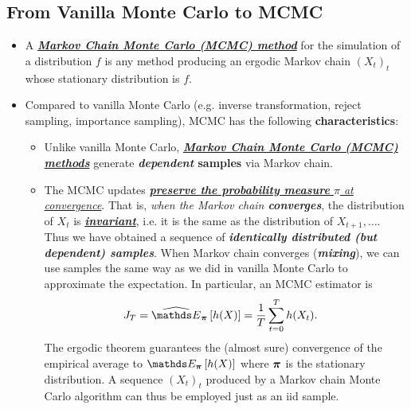 \documentclass[11pt]{article}
\begin{document}
\subsection{From Vanilla Monte Carlo to MCMC}
\begin{itemize}
\item \begin{definition}
A \underline{\emph{\textbf{Markov Chain Monte Carlo (MCMC) method}}} for the simulation of a distribution $f$ is any method producing an ergodic Markov chain $(X_t)_t$ whose stationary distribution is $f$.
\end{definition}

\item Compared to vanilla Monte Carlo (e.g. inverse transformation, reject sampling, importance sampling), MCMC has the following \textbf{characteristics}:
\begin{itemize}
\item Unlike vanilla Monte Carlo, \underline{\emph{\textbf{Markov Chain Monte Carlo (MCMC) methods}}} generate \textbf{\emph{dependent} samples} via Markov chain. 

\item The MCMC updates \underline{\emph{\textbf{preserve the probability measure} $\pi$ at convergence}}. That is, \emph{when the Markov chain \textbf{converges}}, the distribution of $X_t$ is \underline{\emph{\textbf{invariant}}}, i.e. it is the same as the distribution of $X_{t+1}, \ldots$. Thus we have obtained a sequence of \emph{\textbf{identically distributed (but dependent) samples}}. When Markov chain converges (\emph{\textbf{mixing}}), we can use samples the same way as we did in vanilla Monte Carlo to approximate the expectation. In particular, an MCMC estimator is
\begin{align}
J_{T} &= \Em{\mb{\pi}}{h(X)} = \frac{1}{T}\sum_{t=0}^{T}h(X_t). \label{eqn: mcmc_estimator}
\end{align} The ergodic theorem guarantees the (almost sure) convergence of the empirical average  to $\E{\mb{\pi}}{h(X)}$ where $\boldsymbol{\pi}$ is the stationary distribution. A sequence $(X_t)_t$ produced by a Markov chain Monte Carlo algorithm can thus be employed just as an iid sample.



\end{itemize}
\end{itemize}
\end{document}
